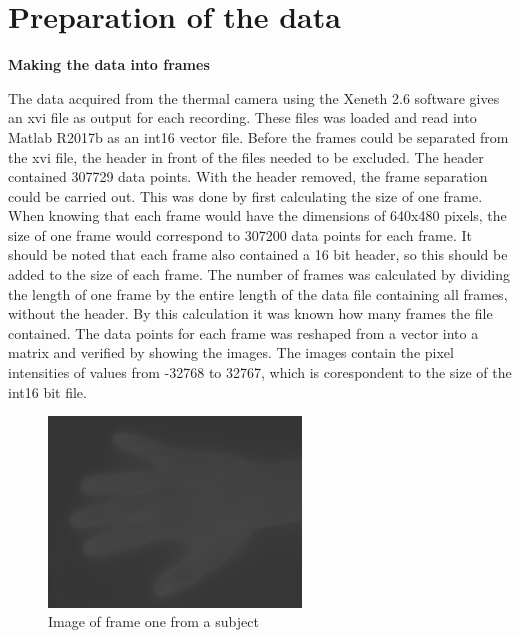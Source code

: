 \chapter{Preparation of the data}

\textbf{Making the data into frames}

The data acquired from the thermal camera using the Xeneth 2.6 software gives an xvi file as output for each recording. These files was loaded and read into Matlab R2017b as an int16 vector file. Before the frames could be separated from the xvi file, the header in front of the files needed to be excluded. The header contained 307729 data points. With the header removed, the frame separation could be carried out. This was done by first calculating the size of one frame. When knowing that each frame would have the dimensions of 640x480 pixels, the size of one frame would correspond to 307200 data points for each frame. It should be noted that each frame also contained a 16 bit header, so this should be added to the size of each frame. The number of frames was calculated by dividing the length of one frame by the entire length of the data file containing all frames, without the header. By this calculation it was known how many frames the file contained. The data points for each frame was reshaped from a vector into a matrix and verified by showing the images. 
The images contain the pixel intensities of values from -32768 to 32767, which is corespondent to the size of the int16 bit file. 


\begin{figure}[H]
	\includegraphics[width=0.6\textwidth]{figures/uint16Hand}  %
	\caption{Image of frame one from a subject}
	\label{fig:hand}  %
\end{figure}